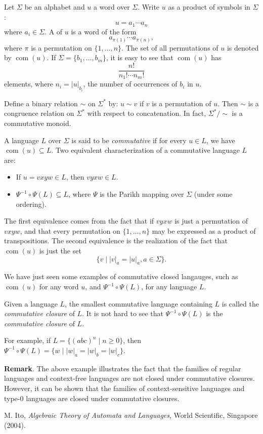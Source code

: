 \documentclass[12pt]{article}
\begin{document}
Let $\Sigma$ be an alphabet and $u$ a word over $\Sigma$.  Write $u$ as a product of symbols in $\Sigma$:
$$u=a_1 \cdots a_n$$
where $a_i \in \Sigma$.  A  of $u$ is a word of the form $$a_{\pi(1)} \cdots a_{\pi(n)},$$
where $\pi$ is a permutation on $\lbrace 1,\ldots, n\rbrace$.  The set of all permutations of $u$ is denoted by $\operatorname{com}(u)$.  If $\Sigma =\lbrace b_1,\ldots, b_m\rbrace$, it is easy to see that $\operatorname{com}(u)$ has $$\frac{n!}{n_1! \cdots n_m!}$$ elements, where $n_i=|u|_{b_i}$, the number of occurrences of $b_i$ in $u$.

Define a binary relation $\sim$ on $\Sigma^*$ by: $u\sim v$ if $v$ is a permutation of $u$.  Then $\sim$ is a congruence relation on $\Sigma^*$ with respect to concatenation.  In fact, $\Sigma^*/\sim$ is a commutative monoid.

A language $L$ over $\Sigma$ is said to be \emph{commutative} if for every $u\in L$, we have $\operatorname{com}(u) \subseteq L$.  Two equivalent characterization of a commutative language $L$ are:
\begin{itemize}
\item If $u=vxyw \in L$, then $vyxw \in L$.
\item $\Psi^{-1}\circ \Psi(L)\subseteq L$, where $\Psi$ is the Parikh mapping over $\Sigma$ (under some ordering).
\end{itemize}

The first equivalence comes from the fact that if $vyxw$ is just a permutation of $vxyw$, and that every permutation on $\lbrace 1,\ldots, n\rbrace$ may be expressed as a product of transpositions.  The second equivalence is the realization of the fact that $\operatorname{com}(u)$ is just the set $$\lbrace v\mid |v|_a = |u|_a, a\in \Sigma \rbrace.$$

We have just seen some examples of commutative closed langauges, such as $\operatorname{com}(u)$ for any word $u$, and $\Psi^{-1}\circ \Psi(L)$, for any language $L$.  

Given a language $L$, the smallest commutative language containing $L$ is called the \emph{commutative closure} of $L$.  It is not hard to see that $\Psi^{-1}\circ \Psi(L)$ is the \emph{commutative closure} of $L$.

For example, if $L=\lbrace (abc)^n \mid n\ge 0\rbrace$, then $\Psi^{-1}\circ \Psi(L) = \lbrace w\mid |w|_a=|w|_b = |w|_c\rbrace$.  

\textbf{Remark}.  The above example illustrates the fact that the families of regular languages and context-free languages are not closed under commutative closures.  However, it can be shown that the families of context-sensitive languages and type-0 languages are closed under commutative closures.

\begin{thebibliography}{9}
 M. Ito, {\em Algebraic Theory of Automata and Languages}, World Scientific, Singapore (2004).
\end{thebibliography}
\end{document}
